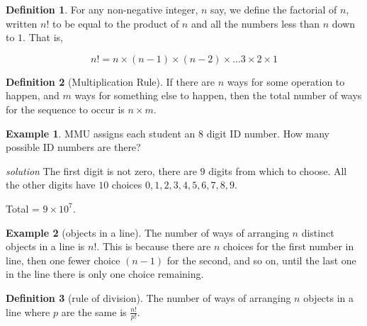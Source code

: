 \documentclass[
]{book}
\theoremstyle{definition}
\newtheorem{definition}{Definition}[chapter]
\theoremstyle{definition}
\newtheorem{example}{Example}[chapter]
\theoremstyle{definition}
\theoremstyle{definition}
\theoremstyle{remark}
\begin{document}
\begin{definition}
For any non-negative integer, \(n\) say, we define the factorial of \(n\), written \(n!\) to be equal to the product of \(n\) and all the numbers less than \(n\) down to \(1\). That is,

\[n! = n \times (n-1) \times (n-2) \times \dots 3 \times 2 \times 1\]
\end{definition}

\begin{definition}[Multiplication Rule]
If there are \(n\) ways for some operation to happen, and \(m\) ways for something else to happen, then the total number of ways for the sequence to occur is \(n \times m\).
\end{definition}

\begin{example}
MMU assigns each student an \(8\) digit ID number. How many possible ID numbers are there?

\emph{solution}
The first digit is not zero, there are \(9\) digits from which to choose.
All the other digits have \(10\) choices \(0,1,2,3,4,5,6,7,8,9\).

Total = \(9 \times 10^7\).
\end{example}

\begin{example}[objects in a line]
The number of ways of arranging \(n\) distinct objects in a line is \(n!\).
This is because there are \(n\) choices for the first number in line, then one fewer choice \((n-1)\) for the second, and so on, until the last one in the line there is only one choice remaining.
\end{example}

\begin{definition}[rule of division]
The number of ways of arranging \(n\) objects in a line where \(p\) are the same is \(\frac{n!}{p!}\).
\end{definition}
\end{document}

